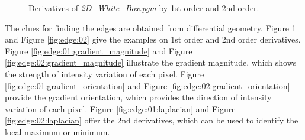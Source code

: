 \documentclass[paper=a4, fontsize=11pt]{scrartcl}
\begin{document}
\begin{figure}[h]
\centering
{}
\caption{Derivatives of \emph{2D\_White\_Box.pgm} by 1st order and 2nd order.}
\label{fig:edge:01}
\end{figure}

The clues for finding the edges are obtained from differential geometry.
Figure \ref{fig:edge:01} and Figure \ref{fig:edge:02} give the examples on 1st order and 2nd order derivatives.
Figure \ref{fig:edge:01:gradient_magnitude} and Figure \ref{fig:edge:02:gradient_magnitude} illustrate the gradient magnitude, which shows the strength of intensity variation of each pixel.
Figure \ref{fig:edge:01:gradient_orientation} and Figure \ref{fig:edge:02:gradient_orientation} provide the gradient orientation, which provides the direction of intensity variation of each pixel.
Figure \ref{fig:edge:01:laplacian} and Figure \ref{fig:edge:02:laplacian} offer the 2nd derivatives, which can be used to identify the local maximum or minimum.
\end{document}
